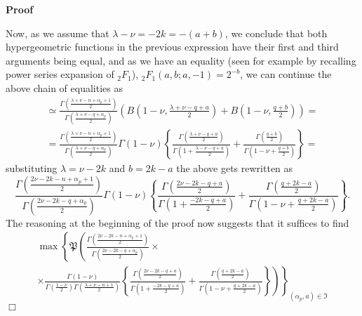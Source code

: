 \documentclass{article}
\newcommand{\um}{-}
\renewenvironment{proof}{\noindent\textbf{Proof\ }}{\hspace*{\fill}$\Box$\medskip}
\theoremstyle{remark}
\begin{document}
\begin{proof}
  
  Now, as we assume that $\lambda - \nu = - 2 k = - (a + b)$, we conclude that
  both hypergeometric functions in the previous expression have their first
  and third arguments being equal, and as we have an equality (seen for
  example by recalling power series expansion of $_2 F_1$), $_2 F_1 (a, b ; a,
  - 1) = 2^{- b}$, we can continue the above chain of equalities as
  \begin{eqnarray}
    & \simeq \frac{\Gamma \left( \frac{\lambda + \nu - n + \alpha_p + 1}{2}
    \right)}{\Gamma \left( \frac{\lambda + \nu - q + \alpha_p}{2} \right)}
    \left( B \left( 1 \um \nu, \frac{\lambda + \nu - q + a}{2} \right) + B
    \left( 1 - \nu, \frac{q + b}{2} \right) \right) = &  \nonumber\\
    & = \frac{\Gamma \left( \frac{\lambda + \nu - n + \alpha_p + 1}{2}
    \right)}{\Gamma \left( \frac{\lambda + \nu - q + \alpha_p}{2} \right)}
    \Gamma (1 - \nu) \left\{ \frac{\Gamma \left( \frac{\lambda + \nu - q +
    a}{2} \right)}{\Gamma \left( 1 + \frac{\lambda - \nu - q + a}{2} \right)}
    + \frac{\Gamma \left( \frac{q + b}{2} \right)}{\Gamma \left( 1 - \nu +
    \frac{q + b}{2} \right)} \right\} = &  \nonumber
  \end{eqnarray}
  substituting $\lambda = \nu - 2 k$ and $b = 2 k - a$ the above gets
  rewritten as\quad
  \[ \frac{\Gamma \left( \frac{2 \nu - 2 k - n + \alpha_p + 1}{2}
     \right)}{\Gamma \left( \frac{2 \nu - 2 k - q + \alpha_p}{2} \right)}
     \Gamma (1 - \nu) \left\{ \frac{\Gamma \left( \frac{2 \nu - 2 k - q +
     a}{2} \right)}{\Gamma \left( 1 + \frac{- 2 k - q + a}{2} \right)} +
     \frac{\Gamma \left( \frac{q + 2 k - a}{2} \right)}{\Gamma \left( 1 - \nu
     + \frac{q + 2 k - a}{2} \right)} \right\} . \]
  The reasoning at the beginning of the proof now suggests that it suffices to
  find
  \begin{eqnarray}
    & \max \left\{ \mathfrak{P} \left( \frac{\Gamma \left( \frac{2 \nu - 2
    k - n + \alpha_p + 1}{2} \right)}{\Gamma \left( \frac{2 \nu - 2 k - q +
    \alpha_p}{2} \right)} \times \right. \right. &  \nonumber\\
    & \times \left. \left. \frac{\Gamma (1 - \nu)}{\Gamma \left( \frac{1 -
    \nu}{2} \right) \Gamma \left( \frac{\lambda + \nu - n + 1}{2} \right)}
    \left\{ \frac{\Gamma \left( \frac{2 \nu - 2 k - q + a}{2} \right)}{\Gamma
    \left( 1 + \frac{- 2 k - q + a}{2} \right)} + \frac{\Gamma \left( \frac{q
    + 2 k - a}{2} \right)}{\Gamma \left( 1 - \nu + \frac{q + 2 k - a}{2}
    \right)} \right\} \right) \right\}_{(\alpha_p, a) \in \mathfrak{I}} & 

\end{eqnarray}
\end{proof}
\end{document}
